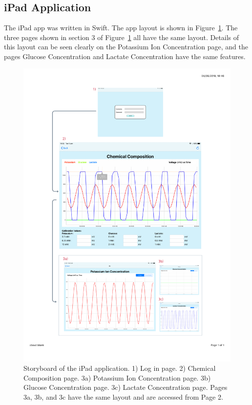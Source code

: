 \subsection{iPad Application}
The iPad app was written in Swift. The app layout is shown in Figure~\ref{fig: storyboard}. The three pages shown in section 3 of Figure~\ref{fig: storyboard} all have the same layout. Details of this layout can be seen clearly on the Potassium Ion Concentration page, and the pages Glucose Concentration and Lactate Concentration have the same features. 

\begin{figure}[p]
\centering
\includegraphics[trim={1cm 2.5cm 1cm  2cm}, clip, width=1\textwidth]{./figures/appStoryboard3.pdf}
\captionsetup{justification=centering}
\caption{Storyboard of the iPad application. 1) Log in page. 2) Chemical Composition page. 3a) Potassium Ion Concentration page. 3b) Glucose Concentration page. 3c) Lactate Concentration page. Pages 3a, 3b, and 3c have the same layout and are accessed from Page 2.}
\label{fig: storyboard}
\end{figure}

